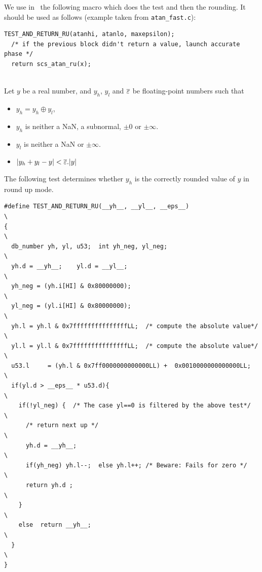 We use in \crlibm\ the following macro which does the test and then the rounding. 
It should be used as follows (example taken from \texttt{atan\_fast.c}):

\begin{lstlisting}[caption={An occurence of the test for rounding up},
  firstnumber=1]
  TEST_AND_RETURN_RU(atanhi, atanlo, maxepsilon);
  /* if the previous block didn't return a value, launch accurate phase */
  return scs_atan_ru(x);
\end{lstlisting}



\begin{theorem}
\label{th:roundingDirected}
~\\
Let $y$ be a real number, and $y_h$, $y_l$ and ${\overline{\varepsilon}}$ be
floating-point numbers such that
  \begin{itemize}
  \item $y_h=y_h\oplus y_l$,
  \item $y_h$ is neither a NaN, a subnormal, $\pm 0$ or $\pm \infty$.
  \item $y_l$ is neither a NaN or $\pm \infty$.
  \item $|y_h+y_l - y| <{\overline{\varepsilon}}.|y|$
\end{itemize}

The following test determines whether $y_h$ is the
  correctly rounded value of $y$ in round up mode.

\begin{lstlisting}[caption={Test for directed rounding},
  firstnumber=1]
#define TEST_AND_RETURN_RU(__yh__, __yl__, __eps__)                    \
{                                                                      \
  db_number yh, yl, u53;  int yh_neg, yl_neg;                          \
  yh.d = __yh__;    yl.d = __yl__;                                     \
  yh_neg = (yh.i[HI] & 0x80000000);                                    \
  yl_neg = (yl.i[HI] & 0x80000000);                                    \
  yh.l = yh.l & 0x7fffffffffffffffLL;  /* compute the absolute value*/ \
  yl.l = yl.l & 0x7fffffffffffffffLL;  /* compute the absolute value*/ \
  u53.l     = (yh.l & 0x7ff0000000000000LL) +  0x0010000000000000LL;   \
  if(yl.d > __eps__ * u53.d){                                          \
    if(!yl_neg) {  /* The case yl==0 is filtered by the above test*/   \
      /* return next up */                                             \
      yh.d = __yh__;                                                   \
      if(yh_neg) yh.l--;  else yh.l++; /* Beware: Fails for zero */    \
      return yh.d ;                                                    \
    }                                                                  \
    else  return __yh__;                                               \
  }                                                                    \
}
\end{lstlisting}
\end{theorem}

